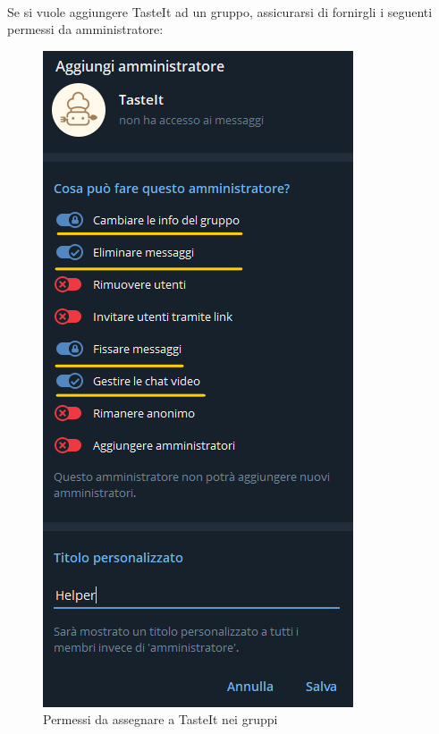 \documentclass[a4paper, 12pt]{article}
\begin{document}
	\paragraph{}
	Se si vuole aggiungere TasteIt ad un gruppo, assicurarsi di fornirgli i seguenti permessi da amministratore:
	\begin{figure}[h!]
		\centering
		\includegraphics[scale=1.1]{adminPermissions.png}
		\caption{Permessi da assegnare a TasteIt nei gruppi}
	\end{figure}
	
	\newpage
\end{document}
